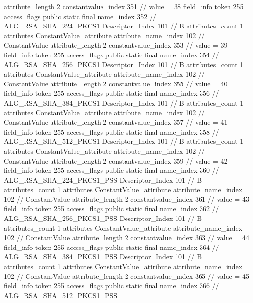 {{{{{{{					attribute_length	2
					constantvalue_index	351		// value = 38
				}
				}
			}
			field_info {
				token	255
				access_flags	public static final
				name_index	352		// ALG_RSA_SHA_224_PKCS1
				Descriptor_Index	101		// B
				attributes_count	1
				attributes {
				ConstantValue_attribute {
					attribute_name_index	102		// ConstantValue
					attribute_length	2
					constantvalue_index	353		// value = 39
				}
				}
			}
			field_info {
				token	255
				access_flags	public static final
				name_index	354		// ALG_RSA_SHA_256_PKCS1
				Descriptor_Index	101		// B
				attributes_count	1
				attributes {
				ConstantValue_attribute {
					attribute_name_index	102		// ConstantValue
					attribute_length	2
					constantvalue_index	355		// value = 40
				}
				}
			}
			field_info {
				token	255
				access_flags	public static final
				name_index	356		// ALG_RSA_SHA_384_PKCS1
				Descriptor_Index	101		// B
				attributes_count	1
				attributes {
				ConstantValue_attribute {
					attribute_name_index	102		// ConstantValue
					attribute_length	2
					constantvalue_index	357		// value = 41
				}
				}
			}
			field_info {
				token	255
				access_flags	public static final
				name_index	358		// ALG_RSA_SHA_512_PKCS1
				Descriptor_Index	101		// B
				attributes_count	1
				attributes {
				ConstantValue_attribute {
					attribute_name_index	102		// ConstantValue
					attribute_length	2
					constantvalue_index	359		// value = 42
				}
				}
			}
			field_info {
				token	255
				access_flags	public static final
				name_index	360		// ALG_RSA_SHA_224_PKCS1_PSS
				Descriptor_Index	101		// B
				attributes_count	1
				attributes {
				ConstantValue_attribute {
					attribute_name_index	102		// ConstantValue
					attribute_length	2
					constantvalue_index	361		// value = 43
				}
				}
			}
			field_info {
				token	255
				access_flags	public static final
				name_index	362		// ALG_RSA_SHA_256_PKCS1_PSS
				Descriptor_Index	101		// B
				attributes_count	1
				attributes {
				ConstantValue_attribute {
					attribute_name_index	102		// ConstantValue
					attribute_length	2
					constantvalue_index	363		// value = 44
				}
				}
			}
			field_info {
				token	255
				access_flags	public static final
				name_index	364		// ALG_RSA_SHA_384_PKCS1_PSS
				Descriptor_Index	101		// B
				attributes_count	1
				attributes {
				ConstantValue_attribute {
					attribute_name_index	102		// ConstantValue
					attribute_length	2
					constantvalue_index	365		// value = 45
				}
				}
			}
			field_info {
				token	255
				access_flags	public static final
				name_index	366		// ALG_RSA_SHA_512_PKCS1_PSS
}}}}}
